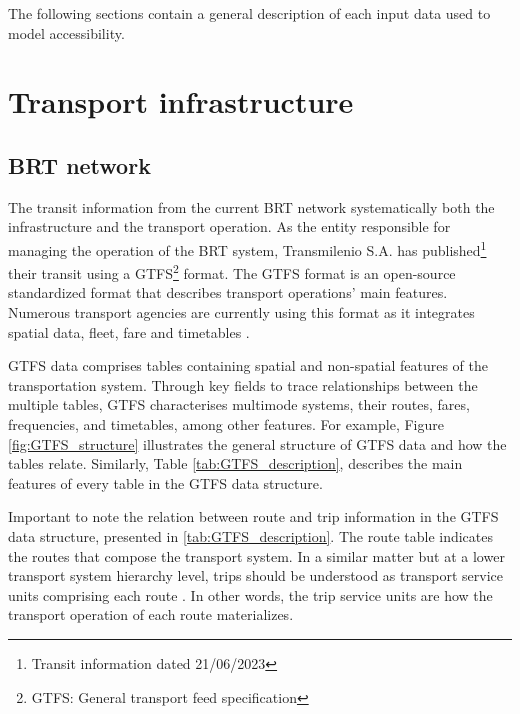 \documentclass[12pt, a4paper]{report}
\begin{document}
The following sections contain a general description of each input data used to model accessibility.





\section{Transport infrastructure}

\subsection{BRT network}

The transit information from the current BRT network systematically both the infrastructure and the transport operation. As the entity responsible for managing the operation of the BRT system, Transmilenio S.A. has published\footnote{Transit information dated 21/06/2023} their transit using a GTFS\footnote{GTFS: General transport feed specification} format. The GTFS format is an open-source standardized format that describes transport operations' main features. Numerous transport agencies are currently using this format as it integrates spatial data, fleet, fare and timetables \citep{pereiraIntroductionUrbanAccessibility2023a, mobiltydataGeneralTransitFeed2023}.

GTFS data comprises tables containing spatial and non-spatial features of the transportation system. Through key fields to trace relationships between the multiple tables, GTFS characterises multimode systems, their routes, fares, frequencies, and timetables, among other features. For example, Figure \ref{fig:GTFS_structure} illustrates the general structure of GTFS data and how the tables relate. Similarly, Table \ref{tab:GTFS_description}, describes the main features of every table in the GTFS data structure.

Important to note the relation between route and trip information in the GTFS data structure, presented in \ref{tab:GTFS_description}. The route table indicates the routes that compose the transport system. In a similar matter but at a lower transport system hierarchy level, trips should be understood as transport service units comprising each route \citep{pereiraIntroductionUrbanAccessibility2023a}. In other words, the trip service units are how the transport operation of each route materializes.
\end{document}
